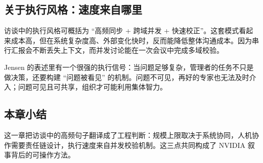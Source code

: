 \subsection{关于执行风格：速度来自哪里}

访谈中的执行风格可概括为 ``高频同步 + 跨域并发 + 快速校正''。这套模式看起来成本高，但在系统复杂度高、外部变化快时，反而能降低整体沟通成本。因为串行汇报会不断丢失上下文，而并发讨论能在一次会议中完成多域校验。

Jensen 的表述里有一个很强的执行信号：当问题足够复杂，管理者的任务不只是做决策，还要构建 ``问题被看见'' 的机制。问题不可见，再好的专家也无法及时介入；问题可见且可共享，组织才可能利用集体智力。

\subsection{本章小结}

这一章把访谈中的高频句子翻译成了工程判断：规模上限取决于系统协同，人机协作需要责任链设计，执行速度来自并发校验机制。这三点共同构成了 NVIDIA 叙事背后的可操作方法。

